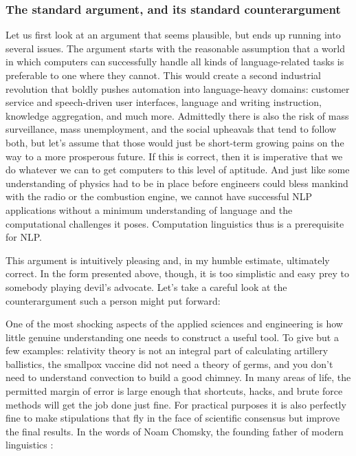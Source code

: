 \subsubsection{The standard argument, and its standard counterargument}
\label{sub:formal_arguments_practical_standard}

Let us first look at an argument that seems plausible, but ends up running into several issues.
The argument starts with the reasonable assumption that a world in which computers can successfully handle all kinds of language-related tasks is preferable to one where they cannot.
This would create a second industrial revolution that boldly pushes automation into language-heavy domains: customer service and speech-driven user interfaces, language and writing instruction, knowledge aggregation, and much more.
Admittedly there is also the risk of mass surveillance, mass unemployment, and the social upheavals that tend to follow both, but let's assume that those would just be short-term growing pains on the way to a more prosperous future.
If this is correct, then it is imperative that we do whatever we can to get computers to this level of aptitude.
And just like some understanding of physics had to be in place before engineers could bless mankind with the radio or the combustion engine, we cannot have successful NLP applications without a minimum understanding of language and the computational challenges it poses.
Computation linguistics thus is a prerequisite for NLP\@.

This argument is intuitively pleasing and, in my humble estimate, ultimately correct.
In the form presented above, though, it is too simplistic and easy prey to somebody playing devil's advocate.
Let's take a careful look at the counterargument such a person might put forward:

One of the most shocking aspects of the applied sciences and engineering is how little genuine understanding one needs to construct a useful tool.
To give but a few examples: relativity theory is not an integral part of calculating artillery ballistics, the smallpox vaccine did not need a theory of germs, and you don't need to understand convection to build a good chimney.
In many areas of life, the permitted margin of error is large enough that shortcuts, hacks, and brute force methods will get the job done just fine.
For practical purposes it is also perfectly fine to make stipulations that fly in the face of scientific consensus but improve the final results.
In the words of Noam Chomsky, the founding father of modern linguistics \citep[147]{Chomsky90}:


